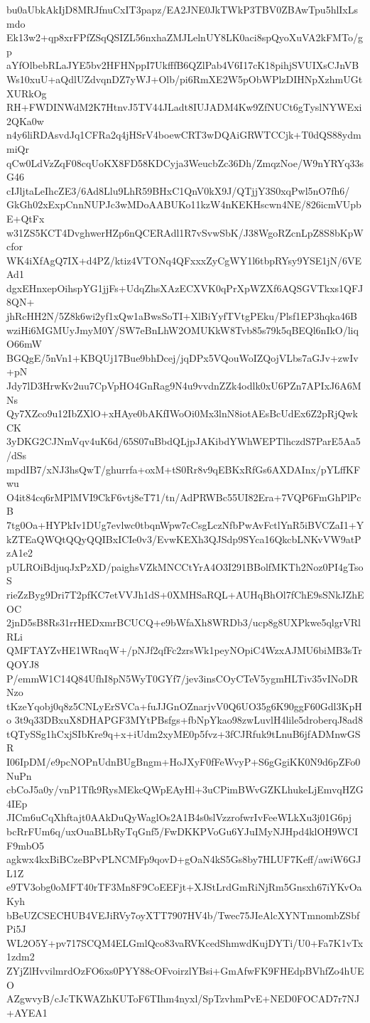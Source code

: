 bu0aUbkAkIjD8MRJfnuCxIT3papz/EA2JNE0JkTWkP3TBV0ZBAwTpu5hlIxLsmdo
Ek13w2+qp8xrFPfZSqQSIZL56nxhaZMJLelnUY8LK0aci8spQyoXuVA2kFMTo/gp
aYfOlbebRLaJYE5bv2HFHNppI7UkfffB6QZlPab4V6I17cK18pihjSVUIXsCJnVB
Ws10xuU+aQdlUZdvqnDZ7yWJ+Olb/pi6RmXE2W5pObWPlzDIHNpXzhmUGtXURkOg
RH+FWDINWdM2K7HtnvJ5TV44JLadt8IUJADM4Kw9ZfNUCt6gTyslNYWExi2QKa0w
n4y6liRDAsvdJq1CFRa2q4jHSrV4boewCRT3wDQAiGRWTCCjk+T0dQS88ydmmiQr
qCw0LdVzZqF08cqUoKX8FD58KDCyja3WeucbZc36Dh/ZmqzNoe/W9nYRYq33sG46
cIJljtaLeIhcZE3/6Ad8Llu9LhR59BHxC1QnV0kX9J/QTjjY3S0xqPwl5nO7fh6/
GkGh02xExpCnnNUPJc3wMDoAABUKo11kzW4nKEKHscwn4NE/826icmVUpbE+QtFx
w31ZS5KCT4DvghwerHZp6nQCERAdl1R7vSvwSbK/J38WgoRZcnLpZ8S8bKpWcfor
WK4iXfAgQ7IX+d4PZ/ktiz4VTONq4QFxxxZyCgWY1l6tbpRYsy9YSE1jN/6VEAd1
dgxEHnxepOihspYG1jjFs+UdqZhsXAzECXVK0qPrXpWZXf6AQSGVTkxs1QFJ8QN+
jhRcHH2N/5Z8k6wi2yf1xQw1aBwsSoTI+XlBiYyfTVtgPEku/Plsf1EP3hqka46B
wziHi6MGMUyJmyM0Y/SW7eBnLhW2OMUKkW8Tvb85s79k5qBEQl6nIkO/liqO66mW
BGQgE/5nVn1+KBQUj17Bue9bhDcej/jqDPx5VQouWoIZQojVLbs7aGJv+zwIv+pN
Jdy7lD3HrwKv2uu7CpVpHO4GnRag9N4u9vvdnZZk4odlk0xU6PZn7APIxJ6A6MNs
Qy7XZco9u12IbZXlO+xHAye0bAKfIWoOi0Mx3lnN8iotAEsBcUdEx6Z2pRjQwkCK
3yDKG2CJNmVqv4uK6d/65S07uBbdQLjpJAKibdYWhWEPTlhczdS7ParE5Aa5/dSs
mpdIB7/xNJ3hsQwT/ghurrfa+oxM+tS0Rr8v9qEBKxRfGs6AXDAInx/pYLffKFwu
O4it84cq6rMPlMVI9CkF6vtj8eT71/tn/AdPRWBc55UI82Era+7VQP6FmGhPlPcB
7tg0Oa+HYPkIv1DUg7evlwc0tbqnWpw7cCsgLczNfbPwAvFctlYnR5iBVCZaI1+Y
kZTEaQWQtQQyQQIBxICIe0v3/EvwKEXh3QJSdp9SYca16QkcbLNKvVW9atPzA1e2
pULROiBdjuqJxPzXD/paighsVZkMNCCtYrA4O3I291BBolfMKTh2Noz0PI4gTsoS
rieZzByg9Dri7T2pfKC7etVVJh1dS+0XMHSaRQL+AUHqBhOl7fChE9sSNkJZhEOC
2jnD5sB8Rs31rrHEDxmrBCUCQ+e9bWfaXh8WRDb3/ucp8g8UXPkwe5qlgrVRlRLi
QMFTAYZvHE1WRnqW+/pNJf2qfFc2zrsWk1peyNOpiC4WzxAJMU6biMB3sTrQOYJ8
P/emmW1C14Q84UfhI8pN5WyT0GYf7/jev3insCOyCTeV5ygmHLTiv35vINoDRNzo
tKzeYqobj0q8z5CNLyErSVCa+fuJJGnOZnarjvV0Q6UO35g6K90ggF60Gdl3KpHo
3t9q33DBxuX8DHAPGF3MYtPBsfgs+fbNpYkao98zwLuvlH4lile5droberqJ8ad8
tQTySSg1hCxjSIbKre9q+x+iUdm2xyME0p5fvz+3fCJRfuk9tLnuB6jfADMnwGSR
I06IpDM/e9pcNOPnUdnBUgBngm+HoJXyF0fFeWvyP+S6gGgiKK0N9d6pZFo0NuPn
cbCoJ5a0y/vnP1Tfk9RysMEkcQWpEAyHl+3uCPimBWvGZKLhukeLjEmvqHZG4IEp
JICm6uCqXhftajt0AAkDuQyWaglOs2A1B4s0slVzzrofwrIvFeeWLkXu3j01G6pj
bcRrFUm6q/uxOuaBLbRyTqGnf5/FwDKKPVoGu6YJuIMyNJHpd4klOH9WCIF9mbO5
agkwx4kxBiBCzeBPvPLNCMFp9qovD+gOaN4kS5Gs8by7HLUF7Keff/awiW6GJL1Z
e9TV3obg0oMFT40rTF3Mn8F9CoEEFjt+XJStLrdGmRiNjRm5Gnsxh67iYKvOaKyh
bBeUZCSECHUB4VEJiRVy7oyXTT7907HV4b/Twec75JIeAlcXYNTmnombZSbfPi5J
WL2O5Y+pv717SCQM4ELGmlQco83vaRVKcedShmwdKujDYTi/U0+Fa7K1vTx1zdm2
ZYjZlHvvilmrdOzFO6xs0PYY88cOFvoirzlYBsi+GmAfwFK9FHEdpBVhfZo4hUEO
AZgwvyB/cJcTKWAZhKUToF6TIhm4nyxl/SpTzvhmPvE+NED0FOCAD7r7NJ+AYEA1
